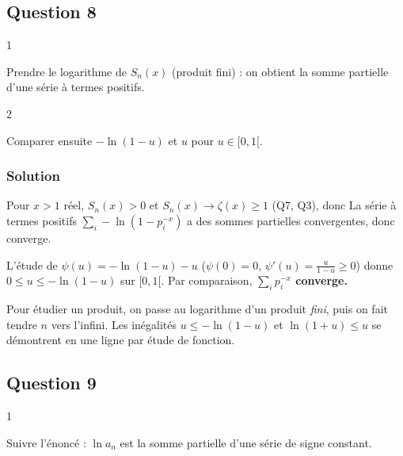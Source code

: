 \documentclass[11pt,a4paper]{article}
\newcommand{\equationajustee}[1]{%
  \sbox{\boiteequation}{$\displaystyle #1$}%
  \ifdim\wd\boiteequation>\linewidth
    \[\resizebox{\linewidth}{!}{\usebox{\boiteequation}}\]%
  \else
    \[#1\]%
  \fi}
\begin{document}
\hypertarget{question-8}{%
\subsection{Question 8}\label{question-8}}

\begin{indication}{1}

Prendre le logarithme de \(S_n(x)\) (produit fini) : on obtient la somme partielle d'une série à termes positifs.

\end{indication}

\begin{indication}{2}

Comparer ensuite \(-\ln(1-u)\) et \(u\) pour \(u\in[0,1[\).

\end{indication}

\hypertarget{solution-7}{%
\subsubsection{Solution}\label{solution-7}}

Pour \(x>1\) réel, \(S_n(x)>0\) et \(S_n(x)\to\zeta(x)\geqslant1\) (Q7, Q3), donc
\equationajustee{\ln S_n(x)=\sum_{i=1}^n-\ln(1-p_i^{-x})\xrightarrow[n\to+\infty]{}\ln\zeta(x).}
La série à termes positifs \(\sum_i-\ln(1-p_i^{-x})\) a des sommes partielles convergentes, donc converge.

L'étude de \(\psi(u)=-\ln(1-u)-u\) (\(\psi(0)=0\), \(\psi'(u)=\frac u{1-u}\geqslant0\)) donne \(0\leqslant u\leqslant-\ln(1-u)\) sur \([0,1[\). Par comparaison, \textbf{\(\sum_i p_i^{-x}\) converge.}

\begin{methode}

Pour étudier un produit, on passe au logarithme d'un produit \emph{fini}, puis on fait tendre \(n\) vers l'infini. Les inégalités \(u\leqslant-\ln(1-u)\) et \(\ln(1+u)\leqslant u\) se démontrent en une ligne par étude de fonction.

\end{methode}

\hypertarget{question-9}{%
\subsection{Question 9}\label{question-9}}

\begin{indication}{1}

Suivre l'énoncé : \(\ln a_n\) est la somme partielle d'une série de signe constant.

\end{indication}
\end{document}
